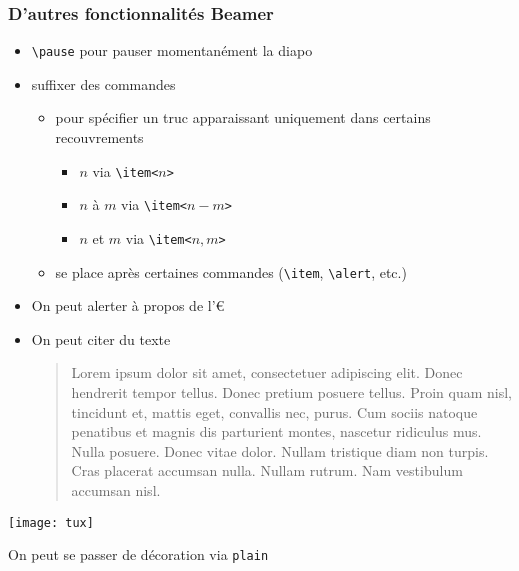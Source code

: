 \begin{frame}[fragile]
  \frametitle{D'autres fonctionnalités Beamer}

    
  \begin{itemize}
  \item \verb|\pause| pour pauser momentanément la diapo
    \pause
  \item<2-> suffixer des commandes

    \begin{itemize}
    \item pour spécifier un truc apparaissant uniquement dans certains recouvrements

      \begin{itemize}
      \item $n$ via \verb|\item<|$n$\verb|>|
      \item $n$ à $m$ via \verb|\item<|$n-m$\verb|>|
      \item $n$ et $m$ via \verb|\item<|$n,m$\verb|>|
      \end{itemize}

    \item se place après certaines commandes (\verb|\item|, \verb|\alert|, etc.)
    \end{itemize}

  \end{itemize}
  
  \pause  
  
  
  \begin{itemize}
  \item On peut \alert{alerter} à propos de l'€
  \item On peut citer du texte
    
    \begin{quotation}
      Lorem ipsum dolor sit amet, consectetuer adipiscing elit. Donec hendrerit tempor tellus. Donec pretium posuere tellus. Proin quam nisl, tincidunt et, mattis eget, convallis nec, purus. Cum sociis natoque penatibus et magnis dis parturient montes, nascetur ridiculus mus. Nulla posuere. Donec vitae dolor. Nullam tristique diam non turpis. Cras placerat accumsan nulla. Nullam rutrum. Nam vestibulum accumsan nisl.
    \end{quotation}
    
  \end{itemize} 
\end{frame}


\begin{frame}
  \begin{center}
    \texttt{[image: tux]}

    On peut se passer de décoration via \verb|plain|
  \end{center}
\end{frame}

